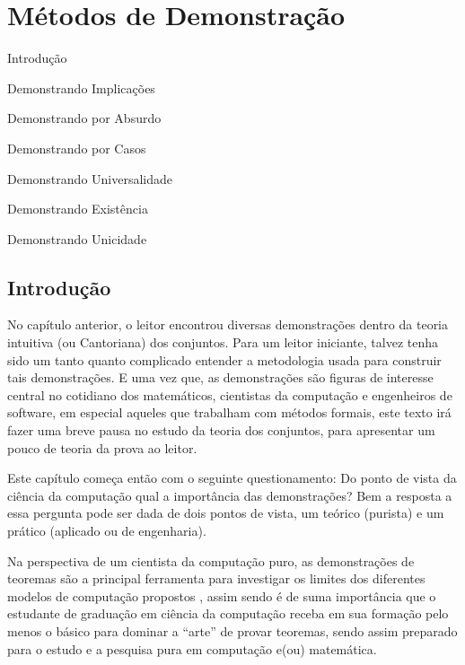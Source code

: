 \chapter{Métodos de Demonstração}\label{cap:Demonstracoes}

\begin{introduction}[Tópicos]
	\item Introdução
	\item Demonstrando Implicações
	\item Demonstrando por Absurdo
	\item Demonstrando por Casos
	\item Demonstrando Universalidade
	\item Demonstrando Existência
	\item Demonstrando Unicidade
\end{introduction}

\section{Introdução}\label{sec:Introducao-Demonstracoes}

No capítulo anterior, o leitor encontrou diversas demonstrações dentro da teoria intuitiva (ou Cantoriana) dos conjuntos. Para um leitor iniciante, talvez tenha sido um tanto quanto complicado entender a metodologia usada para construir tais demonstrações. E uma vez que, as demonstrações são figuras de interesse central no cotidiano dos matemáticos, cientistas da computação e engenheiros de software, em especial aqueles que trabalham com métodos formais, este texto irá fazer uma breve pausa no estudo da teoria dos conjuntos, para apresentar um pouco de teoria da prova ao leitor.

Este capítulo começa então com o seguinte questionamento: Do ponto de vista da ciência da computação qual a importância das demonstrações? Bem a resposta a essa pergunta pode ser dada de dois pontos de vista,  um teórico (purista) e um prático (aplicado ou de engenharia).

Na perspectiva de um cientista da computação puro, as demonstrações de teoremas são a principal ferramenta para investigar os limites dos diferentes modelos de computação propostos \cite{hopcroft2008, linz2006}, assim sendo é de suma importância que o estudante de graduação em ciência da computação receba em sua formação pelo menos o básico para dominar a ``arte'' de provar teoremas, sendo assim preparado para o estudo e a pesquisa pura em computação e(ou) matemática.

